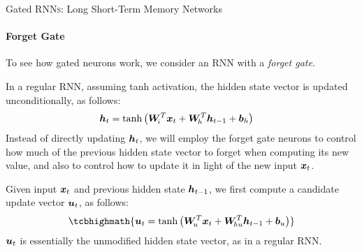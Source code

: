 \begin{frame}{Gated RNN\textsc{s}: Long Short-Term Memory Networks}
	\framesubtitle{Forget Gate}
To see how gated neurons work, we consider an RNN with a {\em forget
gate}. 
%
%

\medskip

In a regular RNN, assuming tanh activation, the hidden state vector is updated unconditionally, as
follows:
\begin{align*}
    {\boldsymbol h}_t & = \tanh\left( {\boldsymbol W}_{\!i}^T {\boldsymbol x}_t + {\boldsymbol W}_{\!h}^T {\boldsymbol h}_{t-1} +
    {\boldsymbol b}_{h} \right)
\end{align*}
Instead of directly updating ${\boldsymbol h}_t$, we will employ the 
forget gate neurons to control how much of
the previous hidden state vector to forget when computing its new value, 
and also to control how to update it in
light of the new input ${\boldsymbol x}_t$.

%

\medskip

Given input ${\boldsymbol x}_t$ and previous hidden state
${\boldsymbol h}_{t-1}$, we first compute a candidate update
vector ${\boldsymbol u}_t$, as follows:
\begin{align*}
    \tcbhighmath{
    \bu_t  = \tanh\lB( \bW_{\!u}^T \bx_t + \bW_{\!hu}^T \bh_{t-1} +
\bb_{u} \rB)}
\end{align*}
${\boldsymbol u}_t$ is essentially the unmodified hidden state vector, as in a regular RNN.
%
\end{frame}

